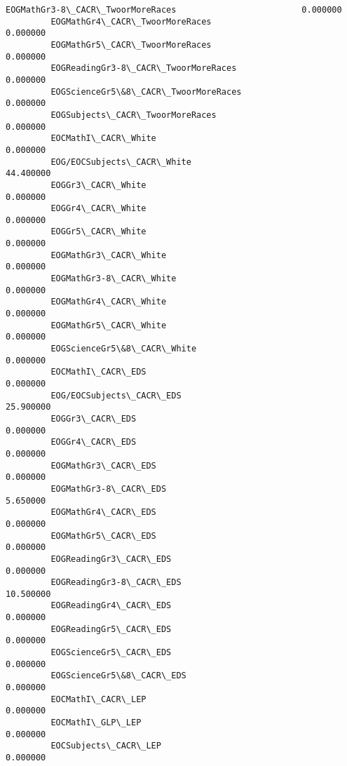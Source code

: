 \documentclass[11pt]{article}
\begin{document}
\begin{Verbatim}[commandchars=\\\{\}]
         EOGMathGr3-8\_CACR\_TwoorMoreRaces                         0.000000   
         EOGMathGr4\_CACR\_TwoorMoreRaces                           0.000000   
         EOGMathGr5\_CACR\_TwoorMoreRaces                           0.000000   
         EOGReadingGr3-8\_CACR\_TwoorMoreRaces                      0.000000   
         EOGScienceGr5\&8\_CACR\_TwoorMoreRaces                      0.000000   
         EOGSubjects\_CACR\_TwoorMoreRaces                          0.000000   
         EOCMathI\_CACR\_White                                      0.000000   
         EOG/EOCSubjects\_CACR\_White                              44.400000   
         EOGGr3\_CACR\_White                                        0.000000   
         EOGGr4\_CACR\_White                                        0.000000   
         EOGGr5\_CACR\_White                                        0.000000   
         EOGMathGr3\_CACR\_White                                    0.000000   
         EOGMathGr3-8\_CACR\_White                                  0.000000   
         EOGMathGr4\_CACR\_White                                    0.000000   
         EOGMathGr5\_CACR\_White                                    0.000000   
         EOGScienceGr5\&8\_CACR\_White                               0.000000   
         EOCMathI\_CACR\_EDS                                        0.000000   
         EOG/EOCSubjects\_CACR\_EDS                                25.900000   
         EOGGr3\_CACR\_EDS                                          0.000000   
         EOGGr4\_CACR\_EDS                                          0.000000   
         EOGMathGr3\_CACR\_EDS                                      0.000000   
         EOGMathGr3-8\_CACR\_EDS                                    5.650000   
         EOGMathGr4\_CACR\_EDS                                      0.000000   
         EOGMathGr5\_CACR\_EDS                                      0.000000   
         EOGReadingGr3\_CACR\_EDS                                   0.000000   
         EOGReadingGr3-8\_CACR\_EDS                                10.500000   
         EOGReadingGr4\_CACR\_EDS                                   0.000000   
         EOGReadingGr5\_CACR\_EDS                                   0.000000   
         EOGScienceGr5\_CACR\_EDS                                   0.000000   
         EOGScienceGr5\&8\_CACR\_EDS                                 0.000000   
         EOCMathI\_CACR\_LEP                                        0.000000   
         EOCMathI\_GLP\_LEP                                         0.000000   
         EOCSubjects\_CACR\_LEP                                     0.000000   

\end{Verbatim}
\end{document}
